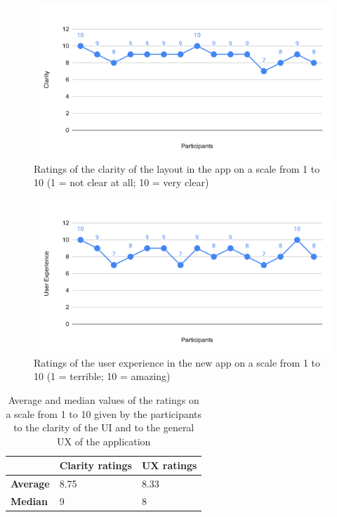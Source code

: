 \documentclass[]{usiinfbachelorproject}
\begin{document}
\begin{figure}[h!]
\centering
\includegraphics[width=\textwidth]{figures/clarity-ratings.png}
\caption {Ratings of the clarity of the layout in the app on a scale from 1 to 10 (1 = not clear at all; 10 = very clear)}
\label{clarity}
\end{figure}

\begin{figure}[h!]
\centering
\includegraphics[width=\textwidth]{figures/ux-ratings.png}
\caption {Ratings of the user experience in the new app on a scale from 1 to 10 (1 = terrible; 10 = amazing)}
\label{ux-ratings}
\end{figure}

\begin{table}[h!]
\centering
\begin{tabular}{|l|l|l|}
\hline
 & \textbf{Clarity ratings} & \textbf{UX ratings} \\ \hline
\textbf{Average} & 8.75 & 8.33 \\ \hline
\textbf{Median} & 9 & 8 \\ \hline
\end{tabular}
\caption{Average and median values of the ratings on a scale from 1 to 10 given by the participants to the clarity of the UI and to the general UX of the application}
\end{table}
\end{document}
